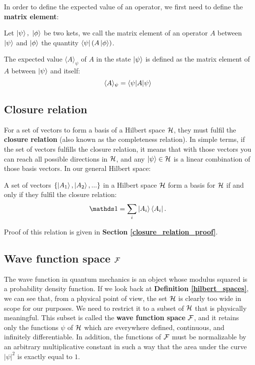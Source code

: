 In order to define the expected value of an operator, we first need to define the \textbf{matrix element}:

\begin{definition}
    Let $\ket{\psi}, \ \ket{\phi}$ be two kets, we call the matrix element of an operator $A$ between $\ket{\psi}$ and $\ket{\phi}$ the quantity $\bra{\psi}(A\ket{\phi})$. 
\end{definition}

\begin{definition}
    The expected value $\langle A \rangle_\psi$ of $A$ in the state $\ket{\psi}$ is defined as the matrix element of $A$ between $\ket{\psi}$ and itself:
    \begin{equation}
        \langle A \rangle_\psi = \braket{\psi|A|\psi}
    \end{equation}
\end{definition}


\subsection{Closure relation}

For a set of vectors to form a basis of a Hilbert space $\mathcal{H}$, they must fulfil the \textbf{closure relation} (also known as the completeness relation). In simple terms, if the set of vectors fulfills the closure relation, it means that with those vectors you can reach all possible directions in $\mathcal{H}$, and any $\ket{\psi}\in\mathcal{H}$ is a linear combination of those basis vectors. In our general Hilbert space:

\begin{definition}
    A set of vectors $\{\ket{A_1}, \ket{A_2}, ...\}$ in a Hilbert space $\mathcal{H}$ form a basis for $\mathcal{H}$ if and only if they fulfil the closure relation:
    \begin{equation}
        \Imat = \sum_i\ket{A_i} \bra{A_i}.
    \end{equation}
\end{definition}

Proof of this relation is given in \textbf{Section \ref{closure_relation_proof}}.

\subsection{Wave function space $\mathcal{F}$}

The wave function in quantum mechanics is an object whose modulus squared is a probability density function. If we look back at \textbf{Definition \ref{hilbert_spaces}}, we can see that, from a physical point of view, the set $\mathcal{H}$ is clearly too wide in scope for our purposes. We need to restrict it to a subset of $\mathcal{H}$ that is physically meaningful. This subset is called the \textbf{wave function space} $\mathcal{F}$, and it retains only the functions $\psi$ of $\mathcal{H}$ which are everywhere defined, continuous, and infinitely differentiable. In addition, the functions of $\mathcal{F}$ must be normalizable by an arbitrary multiplicative constant in such a way that the area under the curve $|\psi|^2$ is exactly equal to $1$.

